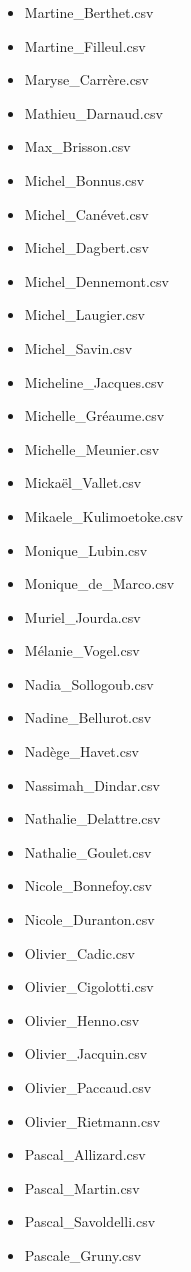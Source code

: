 \documentclass[a4paper,12pt,twoside]{book}
\begin{document}
\begin{itemize}
  \item Martine\_Berthet.csv
  \item Martine\_Filleul.csv
  \item Maryse\_Carrère.csv
  \item Mathieu\_Darnaud.csv
  \item Max\_Brisson.csv
  \item Michel\_Bonnus.csv
  \item Michel\_Canévet.csv
  \item Michel\_Dagbert.csv
  \item Michel\_Dennemont.csv
  \item Michel\_Laugier.csv
  \item Michel\_Savin.csv
  \item Micheline\_Jacques.csv
  \item Michelle\_Gréaume.csv
  \item Michelle\_Meunier.csv
  \item Mickaël\_Vallet.csv
  \item Mikaele\_Kulimoetoke.csv
  \item Monique\_Lubin.csv
  \item Monique\_de\_Marco.csv
  \item Muriel\_Jourda.csv
  \item Mélanie\_Vogel.csv
  \item Nadia\_Sollogoub.csv
  \item Nadine\_Bellurot.csv
  \item Nadège\_Havet.csv
  \item Nassimah\_Dindar.csv
  \item Nathalie\_Delattre.csv
  \item Nathalie\_Goulet.csv
  \item Nicole\_Bonnefoy.csv
  \item Nicole\_Duranton.csv
  \item Olivier\_Cadic.csv
  \item Olivier\_Cigolotti.csv
  \item Olivier\_Henno.csv
  \item Olivier\_Jacquin.csv
  \item Olivier\_Paccaud.csv
  \item Olivier\_Rietmann.csv
  \item Pascal\_Allizard.csv
  \item Pascal\_Martin.csv
  \item Pascal\_Savoldelli.csv
  \item Pascale\_Gruny.csv

\end{itemize}
\end{document}
